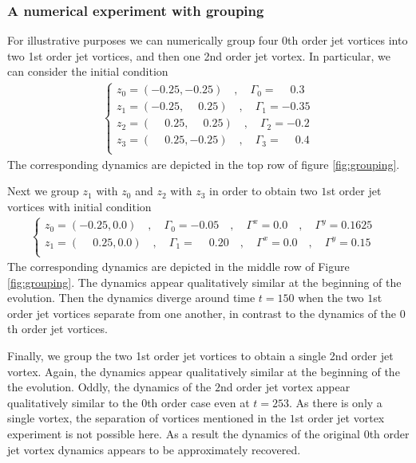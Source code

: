\documentclass[12pt]{amsart}
\theoremstyle{remark}
\begin{document}
\subsubsection{A numerical experiment with grouping}
\label{sec:numerical_grouping}
For illustrative purposes we can numerically group four 0th order jet vortices into two 1st order jet vortices, and then one 2nd order jet vortex.
In particular, we can consider the initial condition
\begin{align}
	\begin{cases}
		z_0 = (-0.25,-0.25) \quad,\quad \Gamma_0 = \phantom{-}0.3 \\
		z_1 = (-0.25,\phantom{-}0.25) \quad,\quad \Gamma_1 = -0.35 \\
		z_2 = (\phantom{-}0.25,\phantom{-}0.25) \quad,\quad \Gamma_2 = -0.2 \\
		z_3 = (\phantom{-}0.25,-0.25) \quad,\quad \Gamma_3 = \phantom{-}0.4 \\		
	\end{cases}
	\label{eq:ic_0}
\end{align}
The corresponding dynamics are depicted in the top row of figure \ref{fig:grouping}.

Next we group $z_1$ with $z_0$ and $z_2$ with $z_3$ in order to obtain two $1$st order jet vortices with initial condition
\begin{align}
	\begin{cases}
		z_0 = (-0.25,0.0) \quad,\quad \Gamma_0 = -0.05 \quad,\quad \Gamma^x = 0.0 \quad, \quad \Gamma^y = 0.1625\\
		z_1 = (\phantom{-}0.25,0.0) \quad,\quad \Gamma_1 = \phantom{-}0.20 \quad, \quad \Gamma^x = 0.0 \quad,\quad \Gamma^y = 0.15\phantom{00}\\
	\end{cases}
	\label{eq:ic_1}
\end{align}
The corresponding dynamics are depicted in the middle row of Figure \ref{fig:grouping}.
The dynamics appear qualitatively similar at the beginning of the evolution.
Then the dynamics diverge around time $t=150$ when the two $1$st order jet vortices separate from one another, 
in contrast to the dynamics of the $0$th order jet vortices.

Finally, we group the two 1st order jet vortices to obtain a single 2nd order jet vortex.
Again, the dynamics appear qualitatively similar at the beginning of the the evolution.
Oddly, the dynamics of the $2$nd order jet vortex appear qualitatively similar to the $0$th
order case even at $t=253$.
As there is only a single vortex, the separation of vortices mentioned in the $1$st order
jet vortex experiment is not possible here.  As a result the dynamics of the original $0$th 
order jet vortex dynamics appears to be approximately recovered.
\end{document}
